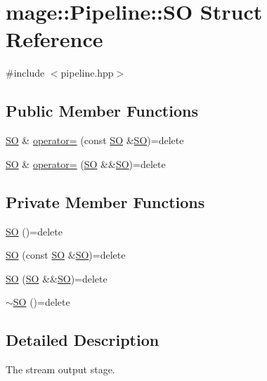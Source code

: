 \hypertarget{structmage_1_1_pipeline_1_1_s_o}{}\section{mage\+:\+:Pipeline\+:\+:SO Struct Reference}
\label{structmage_1_1_pipeline_1_1_s_o}


{\ttfamily \#include $<$pipeline.\+hpp$>$}

\subsection*{Public Member Functions}
\begin{DoxyCompactItemize}
\item 
\hyperlink{structmage_1_1_pipeline_1_1_s_o}{SO} \& \hyperlink{structmage_1_1_pipeline_1_1_s_o_a1ff25345753061e0795ae24adbad228d}{operator=} (const \hyperlink{structmage_1_1_pipeline_1_1_s_o}{SO} \&\hyperlink{structmage_1_1_pipeline_1_1_s_o}{SO})=delete
\item 
\hyperlink{structmage_1_1_pipeline_1_1_s_o}{SO} \& \hyperlink{structmage_1_1_pipeline_1_1_s_o_a8f631857434a17ac1f2c7d6096a80b03}{operator=} (\hyperlink{structmage_1_1_pipeline_1_1_s_o}{SO} \&\&\hyperlink{structmage_1_1_pipeline_1_1_s_o}{SO})=delete
\end{DoxyCompactItemize}
\subsection*{Private Member Functions}
\begin{DoxyCompactItemize}
\item 
\hyperlink{structmage_1_1_pipeline_1_1_s_o_a27e64451f211d1293a6045358d255e64}{SO} ()=delete
\item 
\hyperlink{structmage_1_1_pipeline_1_1_s_o_acd3520819a84b089dca33d55adf4b80a}{SO} (const \hyperlink{structmage_1_1_pipeline_1_1_s_o}{SO} \&\hyperlink{structmage_1_1_pipeline_1_1_s_o}{SO})=delete
\item 
\hyperlink{structmage_1_1_pipeline_1_1_s_o_ae412add667a5d5d734a364746ee134be}{SO} (\hyperlink{structmage_1_1_pipeline_1_1_s_o}{SO} \&\&\hyperlink{structmage_1_1_pipeline_1_1_s_o}{SO})=delete
\item 
\hyperlink{structmage_1_1_pipeline_1_1_s_o_a687cfcfccdb33ecdd42a546b8bed2a44}{$\sim$\+SO} ()=delete
\end{DoxyCompactItemize}


\subsection{Detailed Description}
The stream output stage. 


